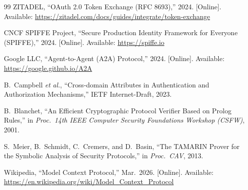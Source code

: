 \documentclass[journal]{IEEEtran}
\begin{document}
\begin{thebibliography}{99}
ZITADEL,
``OAuth 2.0 Token Exchange (RFC 8693),''
2024. [Online]. Available:
\url{https://zitadel.com/docs/guides/integrate/token-exchange}

CNCF SPIFFE Project,
``Secure Production Identity Framework for Everyone (SPIFFE),''
2024. [Online]. Available: \url{https://spiffe.io}

Google LLC,
``Agent-to-Agent (A2A) Protocol,''
2024. [Online]. Available: \url{https://google.github.io/A2A}

B.\ Campbell \textit{et al.},
``Cross-domain Attributes in Authentication and Authorization Mechanisms,''
IETF Internet-Draft, 2023.

B.\ Blanchet,
``An Efficient Cryptographic Protocol Verifier Based on Prolog Rules,''
in \textit{Proc.\ 14th IEEE Computer Security Foundations Workshop (CSFW)},
2001.

S.\ Meier, B.\ Schmidt, C.\ Cremers, and D.\ Basin,
``The TAMARIN Prover for the Symbolic Analysis of Security Protocols,''
in \textit{Proc.\ CAV}, 2013.

Wikipedia,
``Model Context Protocol,''
Mar.\ 2026. [Online]. Available:
\url{https://en.wikipedia.org/wiki/Model_Context_Protocol}

\end{thebibliography}
\end{document}

